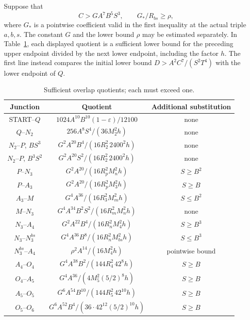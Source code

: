 \documentclass[12pt]{article}
\numberwithin{equation}{section}
\begin{document}
Suppose that
\begin{equation}\label{eq:pr-coarse-gap}
 C>GA^7B^5S^3,
 \qquad G_* /R_{bs}\ge\rho,
\end{equation}
where \(G_*\) is a pointwise coefficient valid in the first inequality
at the actual triple \(a,b,s\). The constant \(G\) and the lower bound
\(\rho\) may be estimated separately. In Table~\ref{tab:pr-overlaps},
each displayed quotient is a sufficient lower bound for the preceding
upper endpoint divided by the next lower endpoint, including the factor
\(h\). The first line instead compares the initial lower bound
\(D>A^2C^7/(S^2T^4)\) with the lower endpoint of \(Q\).
\begin{table}[htbp]
\centering\small
\caption{Sufficient overlap quotients; each must exceed one.}
\label{tab:pr-overlaps}
\begin{tabular}{c|c|c}
Junction&Quotient&Additional substitution\\\hline
START--\(Q\)&\(1024A^{10}B^{10}(1-\varepsilon)/12100\)&none\\
\(Q\)--\(N_2\)&\(256A^8S^4/(36M_2^2h)\)&none\\
\(N_2\)--\(P\), \(BS^3\)&\(G^2A^{20}B^4/(16R_2^2\,2400^2h)\)&none\\
\(N_2\)--\(P\), \(B^3S^2\)&\(G^2A^{20}S^2/(16R_2^2\,2400^2h)\)&none\\
\(P\)--\(N_3\)&\(G^2A^{20}/(16R_p^2M_n^2h)\)&\(S\ge B^2\)\\
\(P\)--\(A_3\)&\(G^2A^{20}/(16R_p^2M_3^2h)\)&\(S\ge B\)\\
\(A_3\)--\(M\)&\(G^4A^{36}/(16R_3^2M_m^2h)\)&\(S\le B^2\)\\
\(M\)--\(N_3\)&\(G^4A^{34}B^2S^2/(16R_m^2M_n^2h)\)&none\\
\(N_3\)--\(A_4\)&\(G^2A^{22}B^4/(16R_n^2M_4^2h)\)&\(S\ge B^3\)\\
\(N_3\)--\(N_3^{bs}\)&\(G^4A^{36}B^8/(16R_n^2M_{bs}^2h)\)&\(S\le B^3\)\\
\(N_3^{bs}\)--\(A_4\)&\(\rho^2A^{14}/(16M_4^2h)\)&pointwise bound\\
\(A_4\)--\(O_4\)&\(G^4A^{38}B^2/(144R_4^2\,42^8h)\)&\(S\ge B\)\\
\(O_4\)--\(A_5\)&\(G^4A^{36}/(4M_5^2(5/2)^8h)\)&\(S\ge B\)\\
\(A_5\)--\(O_5\)&\(G^6A^{54}B^{10}/(144R_5^2\,42^{10}h)\)&\(S\ge B\)\\
\(O_5\)--\(O_6\)&\(G^6A^{52}B^4/(36\cdot42^{12}(5/2)^{10}h)\)&\(S\ge B\)
\end{tabular}
\end{table}
\end{document}
